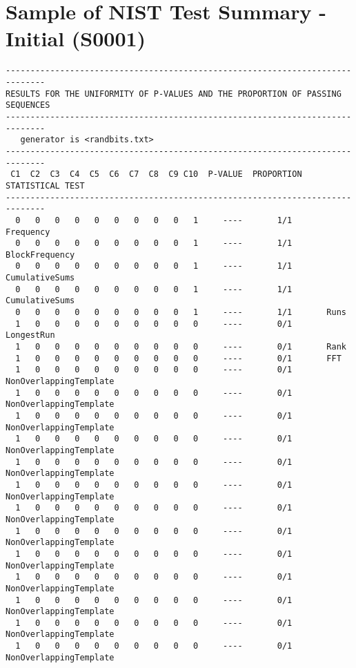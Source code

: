 \chapter{Sample of NIST Test Summary - Initial (S0001)}\label{adx:nist_summary_sample_init_0001}
\begin{code}
    \begin{verbatim}
------------------------------------------------------------------------------
RESULTS FOR THE UNIFORMITY OF P-VALUES AND THE PROPORTION OF PASSING SEQUENCES
------------------------------------------------------------------------------
   generator is <randbits.txt>
------------------------------------------------------------------------------
 C1  C2  C3  C4  C5  C6  C7  C8  C9 C10  P-VALUE  PROPORTION  STATISTICAL TEST
------------------------------------------------------------------------------
  0   0   0   0   0   0   0   0   0   1     ----       1/1       Frequency
  0   0   0   0   0   0   0   0   0   1     ----       1/1       BlockFrequency
  0   0   0   0   0   0   0   0   0   1     ----       1/1       CumulativeSums
  0   0   0   0   0   0   0   0   0   1     ----       1/1       CumulativeSums
  0   0   0   0   0   0   0   0   0   1     ----       1/1       Runs
  1   0   0   0   0   0   0   0   0   0     ----       0/1       LongestRun
  1   0   0   0   0   0   0   0   0   0     ----       0/1       Rank
  1   0   0   0   0   0   0   0   0   0     ----       0/1       FFT
  1   0   0   0   0   0   0   0   0   0     ----       0/1       NonOverlappingTemplate
  1   0   0   0   0   0   0   0   0   0     ----       0/1       NonOverlappingTemplate
  1   0   0   0   0   0   0   0   0   0     ----       0/1       NonOverlappingTemplate
  1   0   0   0   0   0   0   0   0   0     ----       0/1       NonOverlappingTemplate
  1   0   0   0   0   0   0   0   0   0     ----       0/1       NonOverlappingTemplate
  1   0   0   0   0   0   0   0   0   0     ----       0/1       NonOverlappingTemplate
  1   0   0   0   0   0   0   0   0   0     ----       0/1       NonOverlappingTemplate
  1   0   0   0   0   0   0   0   0   0     ----       0/1       NonOverlappingTemplate
  1   0   0   0   0   0   0   0   0   0     ----       0/1       NonOverlappingTemplate
  1   0   0   0   0   0   0   0   0   0     ----       0/1       NonOverlappingTemplate
  1   0   0   0   0   0   0   0   0   0     ----       0/1       NonOverlappingTemplate
  1   0   0   0   0   0   0   0   0   0     ----       0/1       NonOverlappingTemplate
  1   0   0   0   0   0   0   0   0   0     ----       0/1       NonOverlappingTemplate

\end{verbatim}
\end{code}
